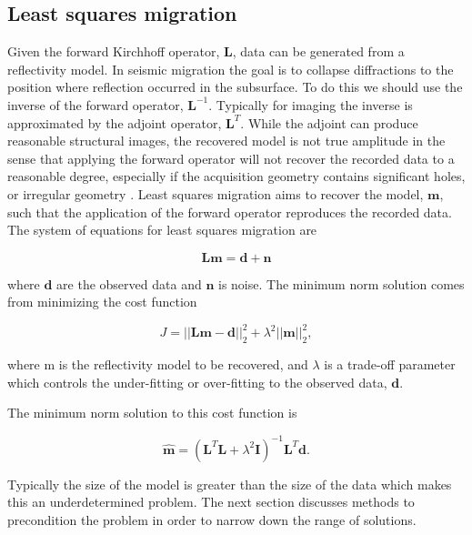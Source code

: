 \subsection{Least squares migration}
Given the forward Kirchhoff operator, $\mathbf{L}$, data can be generated from a reflectivity model. In seismic migration the goal is to collapse diffractions to the position where reflection occurred in the subsurface. To do this we should use the inverse of the forward operator, $\mathbf{L}^{-1}$. Typically for imaging the inverse is approximated by the adjoint operator, $\mathbf{L}^T$. While the adjoint can produce reasonable structural images, the recovered model is not true amplitude in the sense that applying the forward operator will not recover the recorded data to a reasonable degree, especially if the acquisition geometry contains significant holes, or irregular geometry \citep{nemeth1999least}. Least squares migration aims to recover the model, $\mathbf{m}$, such that the application of the forward operator reproduces the recorded data. The system of equations for least squares migration are

\begin{equation}
\mathbf{Lm}=\mathbf{d} + \mathbf{n}
\end{equation}

where $\mathbf{d}$ are the observed data and $\mathbf{n}$ is noise. The minimum norm solution comes from minimizing the cost function

\begin{equation}
J = ||\mathbf{Lm}-\mathbf{d}||^2_2 + \lambda^2|| \mathbf{m}||^2_2, 
\end{equation}

where m is the reflectivity model to be recovered, and $\lambda$ is a trade-off parameter which controls the under-fitting or over-fitting to the observed data, $\mathbf{d}$. 

The minimum norm solution to this cost function is 

\begin{equation}
\hat{\mathbf{m}} = (\mathbf{L}^T\mathbf{L} + \lambda^2\mathbf{I})^{-1}\mathbf{L}^T\mathbf{d}.
\end{equation}

Typically the size of the model is greater than the size of the data which makes this an underdetermined problem. The next section discusses methods to precondition the problem in order to narrow down the range of solutions. 

